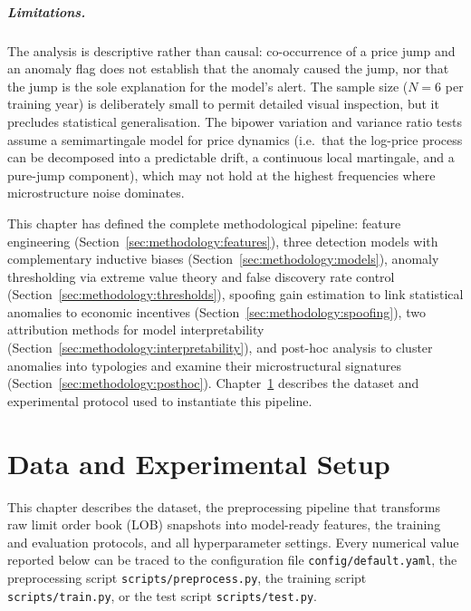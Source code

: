 \documentclass[11pt]{report}
\begin{document}
\paragraph{Limitations.}
The analysis is descriptive rather than causal: co-occurrence of a price jump and an anomaly flag does not establish that the anomaly caused the jump, nor that the jump is the sole explanation for the model's alert. The sample size ($N = 6$ per training year) is deliberately small to permit detailed visual inspection, but it precludes statistical generalisation. The bipower variation and variance ratio tests assume a semimartingale model for price dynamics (i.e.\ that the log-price process can be decomposed into a predictable drift, a continuous local martingale, and a pure-jump component), which may not hold at the highest frequencies where microstructure noise dominates.

\bigskip

This chapter has defined the complete methodological pipeline: feature engineering (Section~\ref{sec:methodology:features}), three detection models with complementary inductive biases (Section~\ref{sec:methodology:models}), anomaly thresholding via extreme value theory and false discovery rate control (Section~\ref{sec:methodology:thresholds}), spoofing gain estimation to link statistical anomalies to economic incentives (Section~\ref{sec:methodology:spoofing}), two attribution methods for model interpretability (Section~\ref{sec:methodology:interpretability}), and post-hoc analysis to cluster anomalies into typologies and examine their microstructural signatures (Section~\ref{sec:methodology:posthoc}). Chapter~\ref{chap:data} describes the dataset and experimental protocol used to instantiate this pipeline.


\chapter{Data and Experimental Setup}\label{chap:data}

This chapter describes the dataset, the preprocessing pipeline that transforms raw limit order book (LOB) snapshots into model-ready features, the training and evaluation protocols, and all hyperparameter settings.
Every numerical value reported below can be traced to the configuration file \texttt{config/default.yaml}, the preprocessing script \texttt{scripts/preprocess.py}, the training script \texttt{scripts/train.py}, or the test script \texttt{scripts/test.py}.
\end{document}
